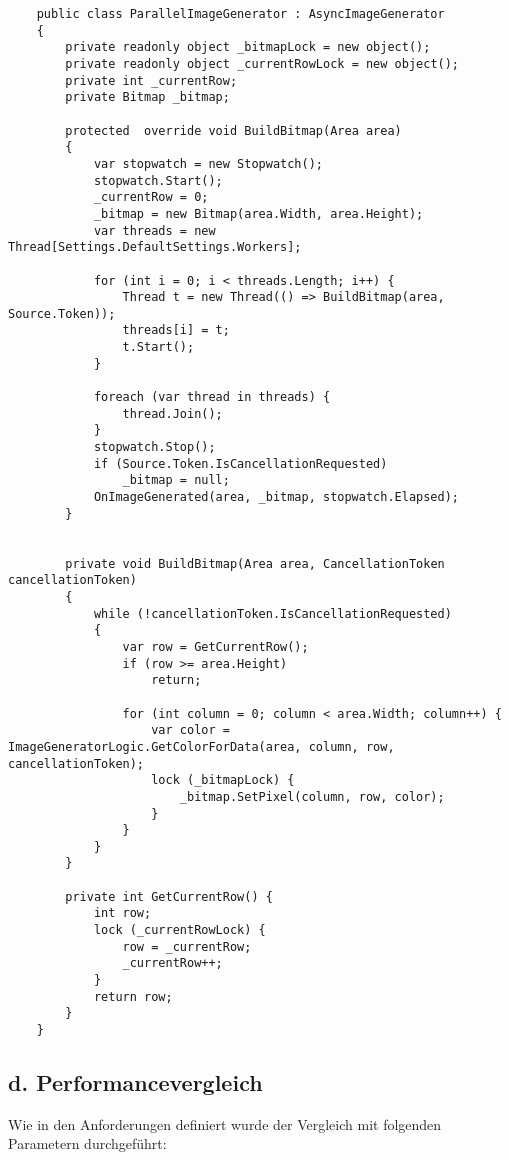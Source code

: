 \documentclass[a4paper,ngerman]{scrartcl}
\begin{document}
\begin{lstlisting}
    public class ParallelImageGenerator : AsyncImageGenerator
    {
        private readonly object _bitmapLock = new object();
        private readonly object _currentRowLock = new object();
        private int _currentRow;
        private Bitmap _bitmap;

        protected  override void BuildBitmap(Area area)
        {
            var stopwatch = new Stopwatch();
            stopwatch.Start();
            _currentRow = 0;
            _bitmap = new Bitmap(area.Width, area.Height);
            var threads = new Thread[Settings.DefaultSettings.Workers];

            for (int i = 0; i < threads.Length; i++) {
                Thread t = new Thread(() => BuildBitmap(area, Source.Token));
                threads[i] = t;
                t.Start();
            }

            foreach (var thread in threads) {
                thread.Join();
            }
            stopwatch.Stop();
            if (Source.Token.IsCancellationRequested)
                _bitmap = null;
            OnImageGenerated(area, _bitmap, stopwatch.Elapsed);
        }


        private void BuildBitmap(Area area, CancellationToken cancellationToken)
        {
            while (!cancellationToken.IsCancellationRequested)
            {
                var row = GetCurrentRow();
                if (row >= area.Height)
                    return;

                for (int column = 0; column < area.Width; column++) {
                    var color = ImageGeneratorLogic.GetColorForData(area, column, row, cancellationToken);
                    lock (_bitmapLock) {
                        _bitmap.SetPixel(column, row, color);
                    }
                }
            }
        }

        private int GetCurrentRow() {
            int row;
            lock (_currentRowLock) {
                row = _currentRow;
                _currentRow++;
            }
            return row;
        }
    }
\end{lstlisting}

\subsection{d. Performancevergleich}
Wie in den Anforderungen definiert wurde der Vergleich mit folgenden Parametern durchgeführt:
\end{document}
